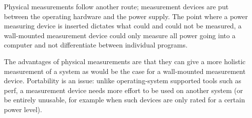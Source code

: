 Physical measurements follow another route; measurement devices are put between the operating hardware and the power supply. 
The point where a power measuring device is inserted dictates what could and could not be measured, a wall-mounted measurement device could only measure all power going into a computer and not differentiate between individual programs.

The advantages of physical measurements are that they can give a more holistic measurement of a system as would be the case for a wall-mounted measurement device. 
Portability is an issue: unlike operating-system supported tools such as perf, a measurement device needs more effort to be used on another system (or be entirely unusable, for example when such devices are only rated for a certain power level).

